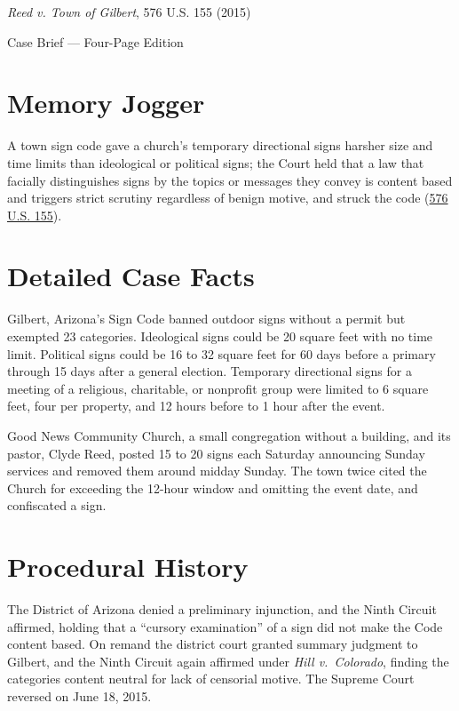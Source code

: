 \documentclass[12pt]{article}
\begin{document}
\begin{center}
{\LARGE \textit{Reed v. Town of Gilbert}, 576 U.S. 155 (2015)\par}
\vspace{0.8em}
{\large Case Brief --- Four-Page Edition\par}
\end{center}
\vspace{1em}

\section{Memory Jogger}

A town sign code gave a church's temporary directional signs harsher size and time limits than ideological or political signs; the Court held that a law that facially distinguishes signs by the topics or messages they convey is content based and triggers strict scrutiny regardless of benign motive, and struck the code (\href{https://supreme.justia.com/cases/federal/us/576/155/}{576 U.S. 155}).

\section{Detailed Case Facts}

Gilbert, Arizona's Sign Code banned outdoor signs without a permit but exempted 23 categories. Ideological signs could be 20 square feet with no time limit. Political signs could be 16 to 32 square feet for 60 days before a primary through 15 days after a general election. Temporary directional signs for a meeting of a religious, charitable, or nonprofit group were limited to 6 square feet, four per property, and 12 hours before to 1 hour after the event.

Good News Community Church, a small congregation without a building, and its pastor, Clyde Reed, posted 15 to 20 signs each Saturday announcing Sunday services and removed them around midday Sunday. The town twice cited the Church for exceeding the 12-hour window and omitting the event date, and confiscated a sign.

\section{Procedural History}

The District of Arizona denied a preliminary injunction, and the Ninth Circuit affirmed, holding that a ``cursory examination'' of a sign did not make the Code content based. On remand the district court granted summary judgment to Gilbert, and the Ninth Circuit again affirmed under \textit{Hill v.\ Colorado}, finding the categories content neutral for lack of censorial motive. The Supreme Court reversed on June 18, 2015.
\end{document}
